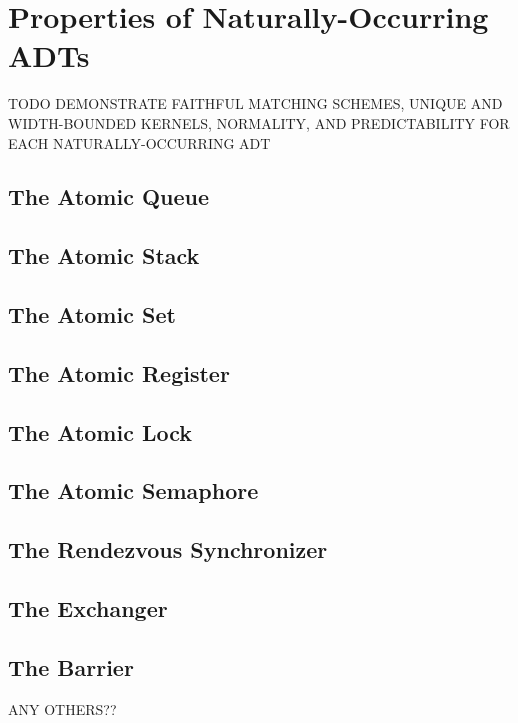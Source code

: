 \section{Properties of Naturally-Occurring ADTs}
\label{sec:nature}

TODO DEMONSTRATE FAITHFUL MATCHING SCHEMES, UNIQUE AND WIDTH-BOUNDED KERNELS,
NORMALITY, AND PREDICTABILITY FOR EACH NATURALLY-OCCURRING ADT

\subsection{The Atomic Queue}

\subsection{The Atomic Stack}

\subsection{The Atomic Set}

\subsection{The Atomic Register}

\subsection{The Atomic Lock}

\subsection{The Atomic Semaphore}

\subsection{The Rendezvous Synchronizer}

\subsection{The Exchanger}

\subsection{The Barrier}

ANY OTHERS??
